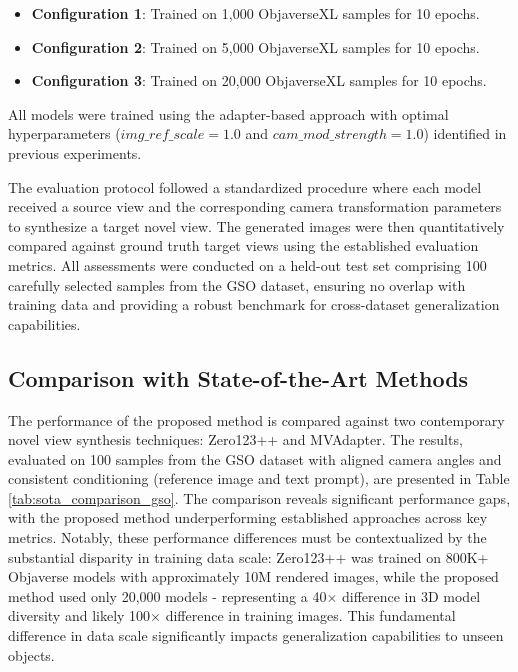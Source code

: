 \begin{itemize}
  \item \textbf{Configuration 1}: Trained on 1,000 ObjaverseXL samples for 10 epochs.
  \item \textbf{Configuration 2}: Trained on 5,000 ObjaverseXL samples for 10 epochs.
  \item \textbf{Configuration 3}: Trained on 20,000 ObjaverseXL samples for 10 epochs.
\end{itemize}

All models were trained using the adapter-based approach with optimal hyperparameters ($img\_ref\_scale=1.0$ and $cam\_mod\_strength=1.0$) identified in previous experiments.

The evaluation protocol followed a standardized procedure where each model received a source view and the corresponding camera transformation parameters to synthesize a target novel view. The generated images were then quantitatively compared against ground truth target views using the established evaluation metrics. All assessments were conducted on a held-out test set comprising 100 carefully selected samples from the GSO dataset, ensuring no overlap with training data and providing a robust benchmark for cross-dataset generalization capabilities.

\subsection{Comparison with State-of-the-Art Methods}\label{ssec:exp_sota_comparison}
The performance of the proposed method is compared against two contemporary novel view synthesis techniques: Zero123++ and MVAdapter. The results, evaluated on 100 samples from the GSO dataset with aligned camera angles and consistent conditioning (reference image and text prompt), are presented in Table \ref{tab:sota_comparison_gso}. The comparison reveals significant performance gaps, with the proposed method underperforming established approaches across key metrics. Notably, these performance differences must be contextualized by the substantial disparity in training data scale: Zero123++ was trained on 800K+ Objaverse models with approximately 10M rendered images, while the proposed method used only 20,000 models - representing a 40$\times$ difference in 3D model diversity and likely 100$\times$ difference in training images. This fundamental difference in data scale significantly impacts generalization capabilities to unseen objects.

